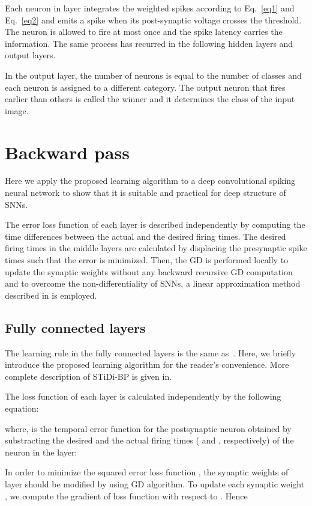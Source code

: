 \documentclass[preprint,twocolumn,5p,12pt]{article}
\begin{document}
Each neuron  in layer  integrates the weighted spikes according to Eq.~\ref{eq1} and Eq.~\ref{eq2} and emits a spike when its post-synaptic voltage  crosses the threshold. The neuron is allowed to fire at most once and the spike latency carries the information.
The same process has recurred in the following hidden layers and output layers.

In the output layer, the number of neurons is equal to the number of classes and each neuron is assigned to a different category. The output neuron that fires earlier than others is called the winner and it determines the class of the input image.

\section{Backward pass}

Here we apply the proposed learning algorithm to a deep convolutional spiking neural network to show that it is suitable and practical for deep structure of SNNs.

The error loss function of each layer is described independently by computing the time differences between the actual and the desired firing times. The desired firing times in the middle layers are calculated by displacing the presynaptic spike times such that the error is minimized.
Then, the GD is performed locally to update the synaptic weights without any backward recursive GD computation and to overcome the non-differentiality of SNNs, a linear approximation method described in \cite{R3} is employed.




\subsection{Fully connected layers}
The learning rule in the fully connected layers is the same as~\cite{R3}.
Here, we briefly introduce the proposed learning algorithm for the reader's convenience. More complete description of STiDi-BP is given in\cite{R3}.

The loss function of each layer  is calculated independently by the following equation:

where,  is the temporal error function for the postsynaptic neuron  obtained by substracting the desired and the actual firing times ( and , respectively) of the neuron  in the  layer:


In order to minimize the squared error loss function , the synaptic weights of layer  should be modified by using GD algorithm. 
To update each synaptic weight , we compute the gradient of loss function with respect to . Hence
\end{document}
